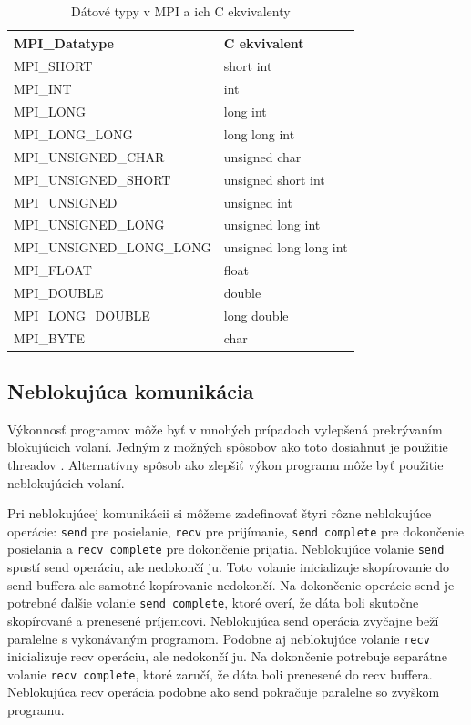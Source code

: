 \begin{table}[!h]
\centering
\begin{tabular}{@{}ll@{}}
\toprule
\textbf{MPI\_Datatype}    & \textbf{C ekvivalent}  \\ \midrule
MPI\_SHORT                & short int              \\
MPI\_INT                  & int                    \\
MPI\_LONG                 & long int               \\
MPI\_LONG\_LONG           & long long int          \\
MPI\_UNSIGNED\_CHAR       & unsigned char          \\
MPI\_UNSIGNED\_SHORT      & unsigned short int     \\
MPI\_UNSIGNED             & unsigned int           \\
MPI\_UNSIGNED\_LONG       & unsigned long int      \\
MPI\_UNSIGNED\_LONG\_LONG & unsigned long long int \\
MPI\_FLOAT                & float                  \\
MPI\_DOUBLE               & double                 \\
MPI\_LONG\_DOUBLE         & long double            \\
MPI\_BYTE                 & char                   \\ \bottomrule
\end{tabular}
\caption{Dátové typy v MPI a ich C ekvivalenty}
\label{tab:mpi-datatypes}
\end{table}

\subsection{Neblokujúca komunikácia}
Výkonnosť programov môže byť v mnohých prípadoch vylepšená prekrývaním blokujúcich volaní.
Jedným z možných spôsobov ako toto dosiahnuť je použitie threadov \cite{mpi3-1}.
Alternatívny spôsob ako zlepšiť výkon programu môže byť použitie neblokujúcich volaní.

Pri neblokujúcej komunikácii si môžeme zadefinovať štyri rôzne neblokujúce operácie: \texttt{send} pre posielanie,
\texttt{recv} pre prijímanie, \texttt{send complete} pre dokončenie posielania a \texttt{recv complete} pre dokončenie prijatia.
Neblokujúce volanie \texttt{send} spustí send operáciu, ale nedokončí ju.
Toto volanie inicializuje skopírovanie do send buffera ale samotné kopírovanie nedokončí.
Na dokončenie operácie send je potrebné ďalšie volanie \texttt{send complete},
ktoré overí, že dáta boli skutočne skopírované a prenesené príjemcovi.
Neblokujúca send operácia zvyčajne beží paralelne s vykonávaným programom.
Podobne aj neblokujúce volanie \texttt{recv} inicializuje recv operáciu, ale nedokončí ju. Na dokončenie potrebuje separátne volanie \texttt{recv complete},
ktoré zaručí, že dáta boli prenesené do recv buffera. Neblokujúca recv operácia podobne ako send pokračuje paralelne so zvyškom programu.

